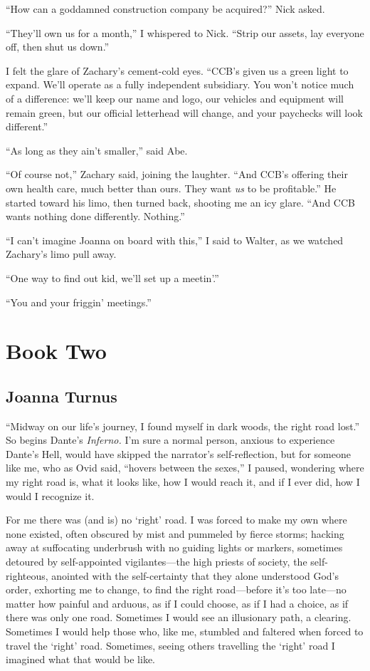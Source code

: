 ``How can a goddamned construction company be acquired?'' Nick asked.

``They'll own us for a month,'' I whispered to Nick. ``Strip our assets,
lay everyone off, then shut us down.''

I felt the glare of Zachary's cement-cold eyes. ``CCB's given us a green
light to expand. We'll operate as a fully independent subsidiary. You
won't notice much of a difference: we'll keep our name and logo, our
vehicles and equipment will remain green, but our official letterhead
will change, and your paychecks will look different.''

``As long as they ain't smaller,'' said Abe.

``Of course not,'' Zachary said, joining the laughter. ``And CCB's
offering their own health care, much better than ours. They want
\emph{us} to be profitable.'' He started toward his limo, then turned
back, shooting me an icy glare. ``And CCB wants nothing done
differently. Nothing.''

``I can't imagine Joanna on board with this,'' I said to Walter, as we
watched Zachary's limo pull away.

``One way to find out kid, we'll set up a meetin'.''

``You and your friggin' meetings.''

\part{Book Two}\setcounter{chapter}{0}

\chapter{Joanna Turnus}

\titlemark

``Midway on our life's journey, I found myself in dark woods, the right
road lost.'' So begins Dante's \emph{Inferno.} I'm sure a normal person,
anxious to experience Dante's Hell, would have skipped the narrator's
self-reflection, but for someone like me, who as Ovid said, ``hovers
between the sexes,'' I paused, wondering where my right road is, what it
looks like, how I would reach it, and if I ever did, how I would I
recognize it.

For me there was (and is) no `right' road. I was forced to make my own
where none existed, often obscured by mist and pummeled by fierce
storms; hacking away at suffocating underbrush with no guiding lights or
markers, sometimes detoured by self-appointed vigilantes---the high
priests of society, the self-righteous, anointed with the self-certainty
that they alone understood God's order, exhorting me to change, to find
the right road---before it's too late---no matter how painful and
arduous, as if I could choose, as if I had a choice, as if there was
only one road. Sometimes I would see an illusionary path, a clearing.
Sometimes I would help those who, like me, stumbled and faltered when
forced to travel the `right' road. Sometimes, seeing others travelling
the `right' road I imagined what that would be like.


